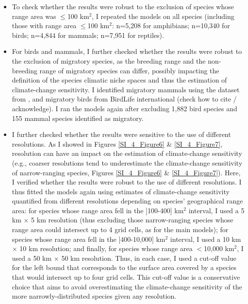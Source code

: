 \begin{itemize}

\item To check whether the results were robust to the exclusion of species whose range area was $\leq$100 km$^2$, I repeated the models on all species (including those with range area $\leq$100 km$^2$: n=5,208 for amphibians; n=10,340 for birds; n=4,844 for mammals; n=7,951 for reptiles). 

\item For birds and mammals, I further checked whether the results were robust to the exclusion of migratory species, as the breeding range and the non-breeding range of migratory species can differ, possibly impacting the definition of the species climatic niche spaces and thus the estimation of climate-change sensitivity. I identified migratory mammals using the dataset from \citet{Gnanadesikan2017}, and migratory birds from BirdLife international (check how to cite / acknowledge). I ran the models again after excluding 1,882 bird species and 155 mammal species identified as migratory.

\item I further checked whether the results were sensitive to the use of different resolutions. As I showed in Figures \ref{SI_4_Figure6} \& \ref{SI_4_Figure7}, resolution can have an impact on the estimation of climate-change sensitivity (e.g., coarser resolutions tend to underestimate the climate-change sensitivity of narrow-ranging species, Figures \ref{SI_4_Figure6} \& \ref{SI_4_Figure7}). Here, I verified whether the results were robust to the use of different resolutions. I thus fitted the models again using estimates of climate-change sensitivity quantified from different resolutions depending on species' geographical range area: for species whose range area fell in the $]$100-400$]$ km$^2$ interval, I used a 5 km $\times$ 5 km resolution (thus excluding those narrow-ranging species whose range area could intersect up to 4 grid cells, as for the main models); for species whose range area fell in the $]$400-10,000$]$ km$^2$ interval, I used a 10 km $\times$ 10 km resolution; and finally, for species whose range area $<$10,000 km$^2$, I used a 50 km $\times$ 50 km resolution. Thus, in each case, I used a cut-off value for the left bound that corresponds to the surface area covered by a species that would intersect up to four grid cells. This cut-off value is a conservative choice that aims to avoid overestimating the climate-change sensitivity of the more narrowly-distributed species given any resolution.


\end{itemize}
